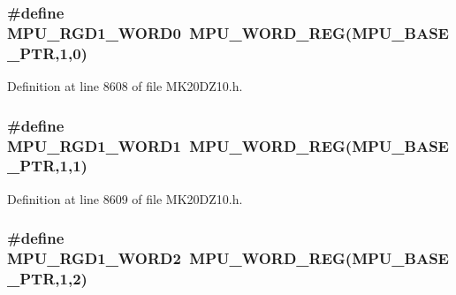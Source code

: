 \subsubsection[{\texorpdfstring{M\+P\+U\+\_\+\+R\+G\+D1\+\_\+\+W\+O\+R\+D0}{MPU_RGD1_WORD0}}]{\setlength{\rightskip}{0pt plus 5cm}\#define M\+P\+U\+\_\+\+R\+G\+D1\+\_\+\+W\+O\+R\+D0~{\bf M\+P\+U\+\_\+\+W\+O\+R\+D\+\_\+\+R\+EG}({\bf M\+P\+U\+\_\+\+B\+A\+S\+E\+\_\+\+P\+TR},1,0)}\hypertarget{group___m_p_u___register___accessor___macros_gaa2ea4b1856e054ee15efee4860427d10}{}\label{group___m_p_u___register___accessor___macros_gaa2ea4b1856e054ee15efee4860427d10}


Definition at line 8608 of file M\+K20\+D\+Z10.\+h.

\subsubsection[{\texorpdfstring{M\+P\+U\+\_\+\+R\+G\+D1\+\_\+\+W\+O\+R\+D1}{MPU_RGD1_WORD1}}]{\setlength{\rightskip}{0pt plus 5cm}\#define M\+P\+U\+\_\+\+R\+G\+D1\+\_\+\+W\+O\+R\+D1~{\bf M\+P\+U\+\_\+\+W\+O\+R\+D\+\_\+\+R\+EG}({\bf M\+P\+U\+\_\+\+B\+A\+S\+E\+\_\+\+P\+TR},1,1)}\hypertarget{group___m_p_u___register___accessor___macros_ga01811cf8e5e1c693e72661fbd0c8381b}{}\label{group___m_p_u___register___accessor___macros_ga01811cf8e5e1c693e72661fbd0c8381b}


Definition at line 8609 of file M\+K20\+D\+Z10.\+h.

\subsubsection[{\texorpdfstring{M\+P\+U\+\_\+\+R\+G\+D1\+\_\+\+W\+O\+R\+D2}{MPU_RGD1_WORD2}}]{\setlength{\rightskip}{0pt plus 5cm}\#define M\+P\+U\+\_\+\+R\+G\+D1\+\_\+\+W\+O\+R\+D2~{\bf M\+P\+U\+\_\+\+W\+O\+R\+D\+\_\+\+R\+EG}({\bf M\+P\+U\+\_\+\+B\+A\+S\+E\+\_\+\+P\+TR},1,2)}\hypertarget{group___m_p_u___register___accessor___macros_gac317cfc09a60a9931baa051eb230c8df}{}\label{group___m_p_u___register___accessor___macros_gac317cfc09a60a9931baa051eb230c8df}


